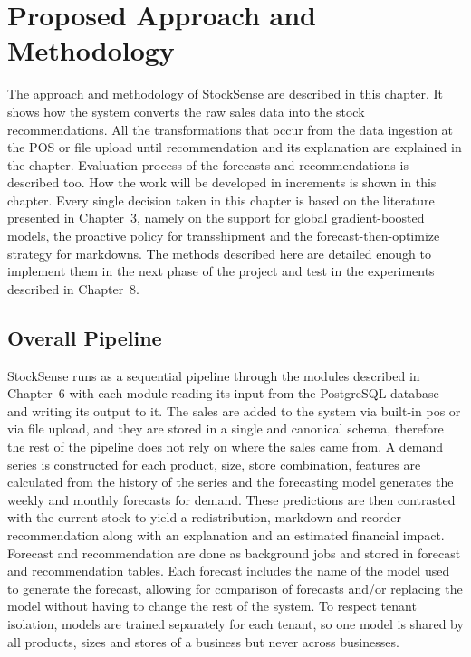 \documentclass{StockSense}
\begin{document}

\chapter{Proposed Approach and Methodology}
\label{ch:methodology}

The approach and methodology of StockSense are described in this chapter. It shows how the system converts the raw sales data into the stock recommendations. All the transformations that occur from the data ingestion at the POS or file upload until recommendation and its explanation are explained in the chapter. Evaluation process of the forecasts and recommendations is described too. How the work will be developed in increments is shown in this chapter. Every single decision taken in this chapter is based on the literature presented in Chapter~3, namely on the support for global gradient-boosted models, the proactive policy for transshipment and the forecast-then-optimize strategy for markdowns. The methods described here are detailed enough to implement them in the next phase of the project and test in the experiments described in Chapter~8.

\section{Overall Pipeline}
\label{sec:pipeline}

StockSense runs as a sequential pipeline through the modules described in Chapter~6 with each module reading its input from the PostgreSQL database and writing its output to it. The sales are added to the system via built-in pos or via file upload, and they are stored in a single and canonical schema, therefore the rest of the pipeline does not rely on where the sales came from. A demand series is constructed for each product, size, store combination, features are calculated from the history of the series and the forecasting model generates the weekly and monthly forecasts for demand. These predictions are then contrasted with the current stock to yield a redistribution, markdown and reorder recommendation along with an explanation and an estimated financial impact. Forecast and recommendation are done as background jobs and stored in forecast and recommendation tables. Each forecast includes the name of the model used to generate the forecast, allowing for comparison of forecasts and/or replacing the model without having to change the rest of the system. To respect tenant isolation, models are trained separately for each tenant, so one model is shared by all products, sizes and stores of a business but never across businesses.
\end{document}
